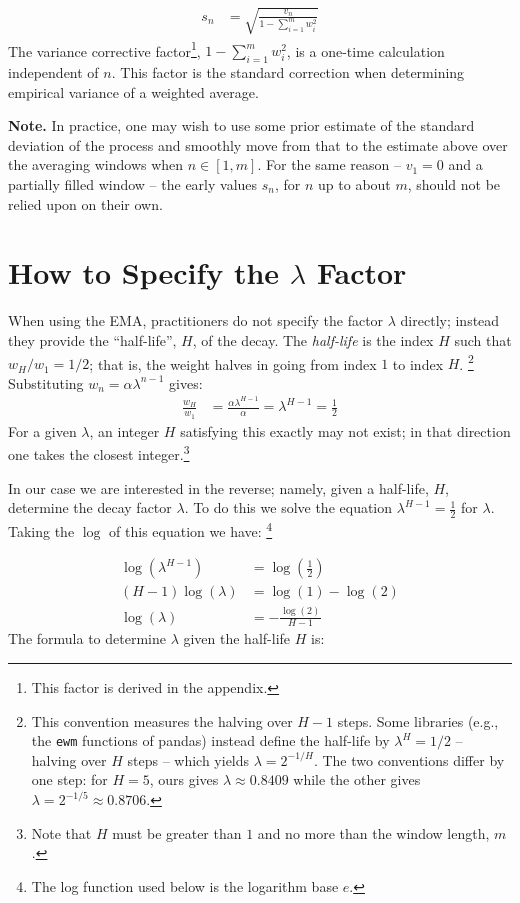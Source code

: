 \documentclass{article}
\begin{document}
\begin{align}
    s_{n} &= \sqrt{\frac{v_n}{1 - \sum_{i=1}^m w_i^2}}  
\end{align}
The variance corrective factor\footnote{This factor is derived in the appendix.}, $1 - \sum_{i=1}^m w_i^2$,
is a one-time calculation independent of $n$. This factor is the standard 
correction when determining empirical variance of a weighted average.

{\bf Note.} In practice, one may wish to use some prior estimate of the standard deviation of the process
and smoothly move from that to the estimate above over the averaging windows when $n \in [1, m]$.
For the same reason -- $v_1 = 0$ and a partially filled window -- the early
values $s_n$, for $n$ up to about $m$, should not be relied upon on their own.


\section{How to Specify the $\lambda$ Factor}
When using the EMA, practitioners do not specify the factor $\lambda$ directly;
instead they provide the ``half-life'', $H$, of the decay.
The {\em half-life\/} is the index $H$ such that $w_H / w_1 = 1/2$; that is,
the weight halves in going from index $1$ to index $H$.%
\footnote{This convention measures the halving over $H - 1$ steps. Some
libraries (e.g., the {\tt ewm} functions of pandas) instead define the
half-life by $\lambda^H = 1/2$ -- halving over $H$ steps -- which yields
$\lambda = 2^{-1/H}$. The two conventions differ by one step: for $H = 5$,
ours gives $\lambda \approx 0.8409$ while the other gives
$\lambda = 2^{-1/5} \approx 0.8706$.}
Substituting $w_n = \alpha \lambda^{n-1}$ gives:
\begin{align}
	\frac{w_H}{w_1} &= \frac{\alpha \lambda^{H-1}}{\alpha} = \lambda^{H-1} = \frac{1}{2}
\end{align}
For a given $\lambda$, an integer $H$ satisfying this exactly may not exist;
in that direction one takes the closest integer.\footnote{Note that $H$ must be greater than $1$
and no more than the window length, $m$.}

In our case we are interested in the reverse; namely, given a half-life, $H$, 
determine the decay factor $\lambda$. To do this we solve the equation $\lambda^{H-1} = \frac{1}{2}$
for $\lambda$.
Taking the $\log$ of this equation we have:%
\footnote{The log function used below is the logarithm base $e$.}

\begin{align*}
	\log(\lambda^{H-1}) &=  \log\left(\frac{1}{2}\right) \\
	(H-1) \log(\lambda) &= \log(1) - \log(2)  \\
    \log(\lambda)   &= -\frac{\log(2)}{H-1} 
\end{align*}
The formula to determine $\lambda$ given the half-life $H$ is:
\end{document}

